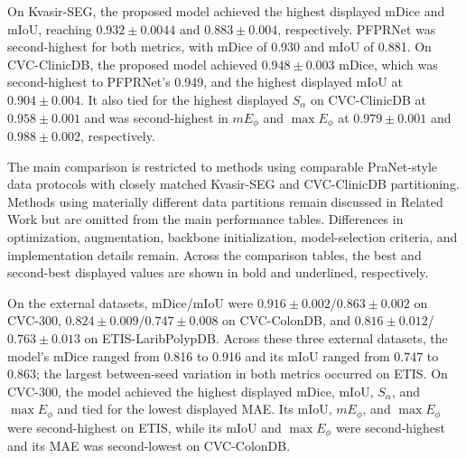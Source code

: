 On Kvasir-SEG, the proposed model achieved the highest displayed mDice and mIoU,
reaching $0.932\pm0.0044$ and $0.883\pm0.004$, respectively. PFPRNet was
second-highest for both metrics, with mDice of 0.930 and mIoU of 0.881. On
CVC-ClinicDB, the proposed model achieved $0.948\pm0.003$ mDice, which was
second-highest to PFPRNet's 0.949, and the highest displayed mIoU at
$0.904\pm0.004$. It also tied for the highest displayed $S_{\alpha}$ on
CVC-ClinicDB at $0.958\pm0.001$ and was second-highest in $mE_{\phi}$ and
$\max E_{\phi}$ at $0.979\pm0.001$ and $0.988\pm0.002$, respectively.

The main comparison is restricted to methods using comparable PraNet-style data
protocols with closely matched Kvasir-SEG and CVC-ClinicDB partitioning. Methods
using materially different data partitions remain discussed in Related Work but are
omitted from the main performance tables. Differences in optimization, augmentation,
backbone initialization, model-selection criteria, and implementation details remain.
Across the comparison tables, the best and second-best displayed values are shown in
bold and underlined, respectively.

On the external datasets, mDice/mIoU were
$0.916\pm0.002$/$0.863\pm0.002$ on CVC-300,
$0.824\pm0.009$/$0.747\pm0.008$ on CVC-ColonDB, and
$0.816\pm0.012$/$0.763\pm0.013$ on ETIS-LaribPolypDB. Across these three
external datasets, the model's mDice ranged from 0.816 to 0.916 and its mIoU
ranged from 0.747 to 0.863; the largest between-seed variation in both metrics
occurred on ETIS. On CVC-300, the model achieved the highest displayed mDice,
mIoU, $S_{\alpha}$, and $\max E_{\phi}$ and tied for the lowest displayed MAE.
Its mIoU, $mE_{\phi}$, and $\max E_{\phi}$ were second-highest on ETIS, while
its mIoU and $\max E_{\phi}$ were second-highest and its MAE was second-lowest
on CVC-ColonDB.

